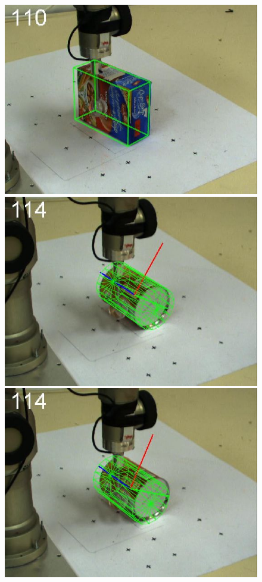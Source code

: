 \begin{figure}[htbp]
{\includegraphics[width=\imgAXwid]{./A2_2exp_87_2}
\includegraphics[width=\imgAXwid]{./A3_2exp_39_2}
\includegraphics[width=\imgAXwid]{./A3_LWPR1_39_2}
}
\end{figure}
